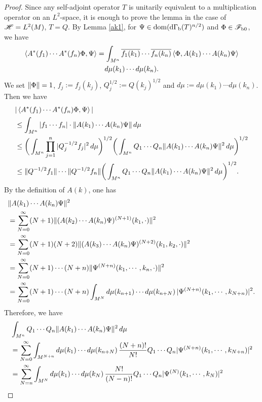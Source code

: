 \documentclass[12pt]{article}
\theoremstyle{plain}
\numberwithin{equation}{section}
\theoremstyle{remark}
\begin{document}
\begin{proof}
Since any self-adjoint operator $T$ is unitarily equivalent to a multiplication operator on an $L^2$-space,
it is enough to prove the lemma in the case of $\mathscr{H}=L^2(M)$, $T=Q$.
By Lemma \ref{ak1}, for $\Psi\in\mathop{\mathrm{dom}}(\mathrm{d\Gamma_b}(T)^{n/2})$ and $\Phi\in\mathscr{F}_{\mathrm{b}0}$, we have
\begin{multline*}
 \left\langle A^*(f_1)\cdots A^*(f_n)\Phi,\Psi\right\rangle
=  \int_{M^n}  \overline{f_1(k_1)}\cdots \overline{f_n(k_n)} \left\langle\Phi,A(k_1)\cdots A(k_n)\Psi\right\rangle\\d\mu(k_1) \cdots d\mu(k_n).
\end{multline*}
We set $\| \Phi \|=1$, $f_j:=f_j(k_j)$, $Q_j^{1/2}:=Q(k_j)^{1/2}$ and $d\mu:=d\mu(k_1)\cdots d\mu(k_n)$.  
Then we have
\begin{align*}
& |\left\langle A^*(f_1)\cdots A^*(f_n)\Phi,\Psi\right\rangle| \\
& \leq  \int_{M^n}  |f_1 \cdots f_n|  \cdot \| A(k_1)\cdots A(k_n)\Psi \|\,d\mu \\
& \leq  \bigg( \int_{M^n}  \prod_{j=1}^n |Q_j^{-1/2}f_j|^2\,d\mu \bigg)^{1/2}  
  \bigg( \int_{M^n} Q_1\cdots Q_n \| A(k_1)\cdots A(k_n)\Psi \|^2\,d\mu \bigg)^{1/2} \\
& \leq  \| Q^{-1/2}f_1 \| \cdots \| Q^{-1/2}f_n \|
  \bigg( \int_{M^n} Q_1\cdots Q_n \| A(k_1)\cdots A(k_n)\Psi \|^2\,d\mu \bigg)^{1/2}.
\end{align*}
By the definition of $A(k)$, one has
\begin{align*}
&  \| A(k_1)\cdots A(k_n)\Psi \|^2 \\
& = \sum_{N=0}^\infty (N+1)\| (A(k_2)\cdots A(k_n)\Psi)^{(N+1)}(k_1,\cdot) \|^2 \\
& = \sum_{N=0}^\infty (N+1)(N+2)\| (A(k_3)\cdots A(k_n)\Psi)^{(N+2)}(k_1,k_2,\cdot) \|^2 \\
& = \sum_{N=0}^\infty (N+1)\cdots (N+n) \| \Psi^{(N+n)}(k_1,\cdots,k_n,\cdot) \|^2 \\
& = \sum_{N=0}^\infty (N+1)\cdots (N+n) \int_{M^N} d\mu(k_{n+1})\cdots d\mu(k_{n+N})\,|\Psi^{(N+n)}(k_1,\cdots,k_{N+n})|^2.
\end{align*}
Therefore, we have
\begin{align}
&\int_{M^n} Q_1\cdots Q_n \norm{A(k_1)\cdots A(k_n)\Psi}^2\,d\mu  \notag \\
&= \sum_{N=0}^\infty  \int_{M^{N+n}} d\mu(k_1)\cdots d\mu(k_{n+N})\,\frac{(N+n)!}{N!} Q_1\cdots Q_n| \Psi^{(N+n)}(k_1,\cdots,k_{N+n})|^2 \notag \\
&= \sum_{N=n}^\infty  \int_{M^N} d\mu(k_1)\cdots d\mu(k_N)\,\frac{N!}{(N-n)!} Q_1\cdots Q_n| \Psi^{(N)}(k_1,\cdots,k_N)|^2 \notag \\

\end{align}
\end{proof}
\end{document}

